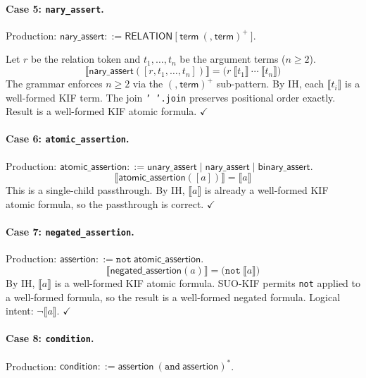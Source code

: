 \paragraph{Case 5: \texttt{nary\_assert}.}
Production: $\mathsf{nary\_assert} ::= \mathsf{RELATION}\ \texttt{[}\ \mathsf{term}\ (\texttt{,}\ \mathsf{term})^{+}\ \texttt{]}$.

Let $r$ be the relation token and $t_1, \dots, t_n$ be the argument terms ($n \geq 2$).
\begin{equation*}
  \llbracket \mathsf{nary\_assert}([r, t_1, \dots, t_n]) \rrbracket
    = \texttt{(}r\ \llbracket t_1 \rrbracket\ \cdots\ \llbracket t_n \rrbracket\texttt{)}
\end{equation*}
The grammar enforces $n \geq 2$ via the $(\texttt{,}\ \mathsf{term})^{+}$ sub-pattern.
By IH, each $\llbracket t_i \rrbracket$ is a well-formed KIF term.
The join \texttt{' '.join} preserves positional order exactly.
Result is a well-formed KIF atomic formula. \hfill$\checkmark$

\paragraph{Case 6: \texttt{atomic\_assertion}.}
Production: $\mathsf{atomic\_assertion} ::= \mathsf{unary\_assert} \mid \mathsf{nary\_assert} \mid \mathsf{binary\_assert}$.
\begin{equation*}
  \llbracket \mathsf{atomic\_assertion}([a]) \rrbracket = \llbracket a \rrbracket
\end{equation*}
This is a single-child passthrough. By IH, $\llbracket a \rrbracket$ is already a
well-formed KIF atomic formula, so the passthrough is correct. \hfill$\checkmark$

\paragraph{Case 7: \texttt{negated\_assertion}.}
Production: $\mathsf{assertion} ::= \texttt{not}\ \mathsf{atomic\_assertion}$.
\begin{equation*}
  \llbracket \mathsf{negated\_assertion}(a) \rrbracket
    = \texttt{(not}\ \llbracket a \rrbracket\texttt{)}
\end{equation*}
By IH, $\llbracket a \rrbracket$ is a well-formed KIF atomic formula.
SUO-KIF permits \texttt{not} applied to a well-formed formula, so the result is a
well-formed negated formula. Logical intent: $\lnot \llbracket a \rrbracket$.
\hfill$\checkmark$

\paragraph{Case 8: \texttt{condition}.}
Production: $\mathsf{condition} ::= \mathsf{assertion}\ (\texttt{and}\ \mathsf{assertion})^{*}$.

